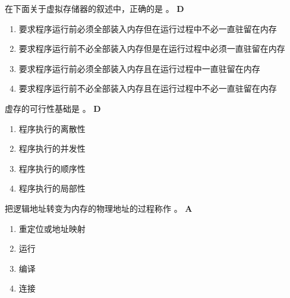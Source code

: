 \begin{problem}
	在下面关于虚拟存储器的叙述中，正确的是 \myline。
	\textbf{D}
		\begin{enumerate}[label=\Alph*.]
			\item 要求程序运行前必须全部装入内存但在运行过程中不必一直驻留在内存
			\item 要求程序运行前不必全部装入内存但是在运行过程中必须一直驻留在内存
			\item 要求程序运行前必须全部装入内存且在运行过程中一直驻留在内存
			\item 要求程序运行前不必全部装入内存且在运行过程中不必一直驻留在内存
		\end{enumerate}
\end{problem}



\begin{problem}
	​虚存的可行性基础是 \myline。
	\textbf{D}
	\vspace{-0.5em}
	\begin{multicols}{4}
		\begin{enumerate}[label=\Alph*.]
			\item 程序执行的离散性
			\item 程序执行的并发性
			\item 程序执行的顺序性
			\item 程序执行的局部性
		\end{enumerate}
	\end{multicols}
	\vspace{-1em}
\end{problem}


\begin{problem}
	把逻辑地址转变为内存的物理地址的过程称作 \myline。
	\textbf{A}
	\vspace{-0.5em}
	\begin{multicols}{4}
		\begin{enumerate}[label=\Alph*.]
			\item 重定位或地址映射
			\item 运行
			\item 编译
			\item 连接
		\end{enumerate}
	\end{multicols}
	\vspace{-1em}
\end{problem}


